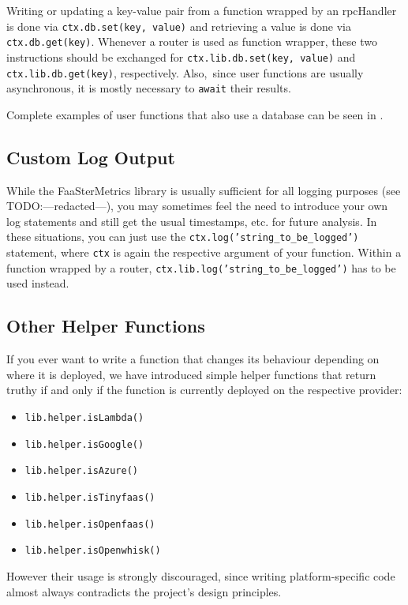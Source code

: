 \documentclass[../main.tex]{subfiles}
\begin{document}
Writing or updating a key-value pair from a function wrapped by an rpcHandler is done via \texttt{ctx.db.set(key, value)}
and retrieving a value is done via \texttt{ctx.db.get(key)}.
Whenever a router is used as function wrapper, these two instructions should be exchanged for
\texttt{ctx.lib.db.set(key, value)} and \texttt{ctx.lib.db.get(key)}, respectively.
Also,~since user functions are usually asynchronous, it is mostly necessary to \texttt{await} their results.

Complete examples of user functions that also use a database can be seen in 
.

\subsection{Custom Log Output}\label{sub:functionCustomLogs}

While the FaaSterMetrics library is usually sufficient for all logging purposes (see TODO:\@ ---redacted---),
you may sometimes feel the need to introduce your own log statements and still get the usual timestamps, etc.\@
for future analysis.
In these situations, you can just use the \texttt{ctx.log('string_to_be_logged')} statement,
where \texttt{ctx} is again the respective argument of your function.
Within a function wrapped by a router, \texttt{ctx.lib.log('string_to_be_logged')} has to be used instead.

\subsection{Other Helper Functions}\label{sub:helperFunctions}

If you ever want to write a function that changes its behaviour depending on where it is deployed,
we have introduced simple helper functions that return truthy if and only if 
the function is currently deployed on the respective provider:
\begin{itemize}
  \item \texttt{lib.helper.isLambda()}
  \item \texttt{lib.helper.isGoogle()}
  \item \texttt{lib.helper.isAzure()}
  \item \texttt{lib.helper.isTinyfaas()}
  \item \texttt{lib.helper.isOpenfaas()}
  \item \texttt{lib.helper.isOpenwhisk()}
\end{itemize}
However their usage is strongly discouraged, 
since writing platform-specific code almost always contradicts the project's design principles.
\end{document}
